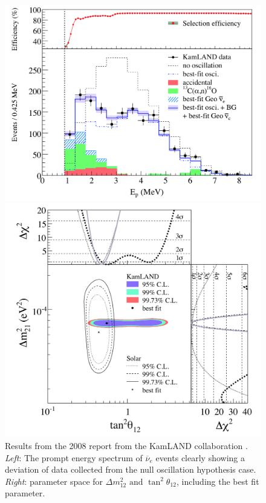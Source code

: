 \documentclass[11pt]{article}
\newcommand{\nuebar}{\ensuremath{\overline{\nu }_{e}} \hspace{1pt}}
\numberwithin{equation}{section}
\begin{document}
\begin{figure}[h]
\centering
\begin{minipage}{.49\textwidth}
  \includegraphics[width=\textwidth]{./KamLAND_Spectrum.PNG}
\end{minipage}
\hfill
\begin{minipage}{.49\textwidth}
  \includegraphics[width=\textwidth]{./KamLAND_Parameters.PNG}
\end{minipage}

\caption[KamLAND results]{Results from the 2008 report from the KamLAND collaboration \cite{araki2005measurement}. \textit{Left}: The prompt energy spectrum of \nuebar events clearly showing a deviation of data collected from the null oscillation hypothesis case. \textit{Right}: parameter space for $\Delta m^{2}_{12} \text{ and } \tan ^{2} \theta_{12}$, including the best fit parameter.}
\label{fig:KamLAND}
\end{figure}
\end{document}
